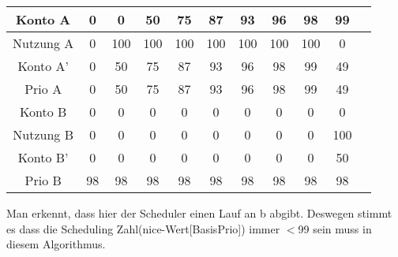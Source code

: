     \begin{center}
        \begin{tabular}{|c|c|c|c|c|c|c|c|c|c|c|}    \hline
            Konto A     &   0   &0      &   50      &   75      &   87      &   93      &   96      &   98      &   99      \\  \hline
            Nutzung A   &   0   &100    &   100     &   100     &   100     &   100     &   100     &   100     &   0       \\  \hline
            Konto A'    &   0   &50     &   75      &   87      &   93      &   96      &   98      &   99      &   49      \\  \hline
            Prio A      &   0   &50     &   75      &   87      &   93      &   96      &   98      &   99      &   49      \\  \hline\hline
            Konto B     &   0   &0      &   0       &   0       &   0       &   0       &   0       &   0       &   0       \\  \hline
            Nutzung B   &   0   &0      &   0       &   0       &   0       &   0       &   0       &   0       &   100     \\  \hline
            Konto B'    &   0   &0      &   0       &   0       &   0       &   0       &   0       &   0       &   50      \\  \hline
            Prio B      &   98  &98     &   98      &   98      &   98      &   98      &   98      &   98      &   98      \\  \hline
        \end{tabular}
    \end{center} \par\medskip

    Man erkennt, dass hier der Scheduler einen Lauf an b abgibt.
    Deswegen stimmt es dass die Scheduling Zahl(nice-Wert[BasisPrio]) immer $<$99 sein muss in diesem Algorithmus.
    
    
